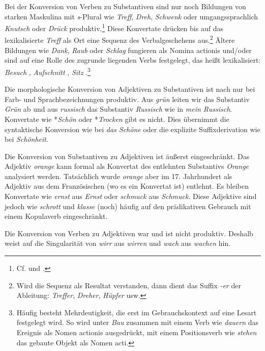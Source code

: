Bei der Konversion von Verben zu Substantiven sind nur noch Bildungen von starken Maskulina mit \textit{s}-Plural wie \textit{Treff}, \textit{Dreh}, \textit{Schwenk} oder umgangssprachlich \textit{Knutsch} oder \textit{Drück} produktiv.\footnote{Cf. \citet[128]{Reis1983} und \citet[137--138]{Vogel1996}.} Diese Konvertate drücken bis auf das lexikalisierte \textit{Treff} als Ort eine Sequenz des Verbalgeschehens aus.\footnote{Wird die Sequenz als Resultat verstanden, dann dient das Suffix \textit{-er} der Ableitung: \textit{Treffer}, \textit{Dreher}, \textit{Hüpfer} usw.} Ältere Bildungen wie \textit{Dank}, \textit{Raub} oder \textit{Schlag} fungieren als Nomina actionis und/oder sind auf eine Rolle des zugrunde liegenden Verbs festgelegt, das heißt lexikalisiert: \textit{Besuch} , \textit{Aufschnitt} , \textit{Sitz} .\footnote{Häufig besteht Mehrdeutigkeit, die erst im Gebrauchskontext auf eine Lesart festgelegt wird. So wird unter \textit{Bau} zusammen mit einem Verb wie \textit{dauern} das Ereignis als Nomen actionis ausgedrückt, mit einem Positionsverb wie \textit{stehen} das gebaute Objekt als Nomen acti.}

Die morphologische Konversion von Adjektiven zu Substantiven ist nach \citet[398]{Wilmanns1896Wb} nur bei Farb- und Sprachbezeichnungen produktiv. Aus \textit{grün} leiten wir das Substantiv \textit{Grün} ab und aus \textit{russisch} das Substantiv \textit{Russisch} wie in \textit{mein Russisch}. Konvertate wie *\textit{Schön} oder *\textit{Trocken} gibt es nicht. Dies übernimmt die syntaktische Konversion wie bei \textit{das Schöne} oder die explizite Suffixderivation wie bei \textit{Schönheit}.

Die Konversion von Substantiven zu Adjektiven ist äußerst eingeschränkt. Das Adjektiv \textit{orange} kann formal als Konvertat des entlehnten Substantivs \textit{Orange} analysiert werden. Tatsächlich wurde \textit{orange} aber im 17. Jahrhundert als Adjektiv aus dem Französischen (wo es ein Konvertat ist) entlehnt. Es bleiben Konvertate wie \textit{ernst} aus \textit{Ernst} oder \textit{schmuck} aus \textit{Schmuck}. Diese Adjektive sind jedoch wie \textit{schrott} und \textit{klasse} (noch) häufig auf den prädikativen Gebrauch mit einem Kopulaverb eingeschränkt. 

Die Konversion von Verben zu Adjektiven war und ist nicht produktiv. Deshalb weist \citet[414]{Wilmanns1896Wb} auf die Singularität von \textit{wirr} aus \textit{wirren} und \textit{wach} aus \textit{wachen} hin.

